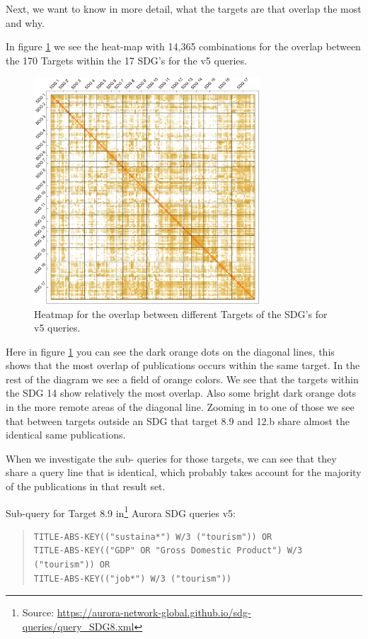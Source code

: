 \documentclass{article}
\begin{document}
Next, we want to know in more detail, what the targets are that overlap the most and why.

In  figure \ref{heatmapoverlapv5subqueries} we see the heat-map with 14,365 combinations for the overlap between the 170 Targets within the 17 SDG's for the v5 queries. 

\begin{figure}[H]
	\centering
  \includegraphics[width=0.75\textwidth]{figures/overlap_per_subquery.pdf}
	\caption{Heatmap for the overlap between different Targets of the SDG's for v5 queries.}
	\label{heatmapoverlapv5subqueries}
\end{figure}

Here in figure \ref{heatmapoverlapv5subqueries} you can see the dark orange dots on the diagonal lines, this shows that the most overlap of publications occurs within the same target. In the rest of the diagram we see a field of orange colors. We see that the targets within the SDG 14 show relatively the most overlap. Also some bright dark orange dots in the more remote areas of the diagonal line. Zooming in to one of those we see that between targets outside an SDG that target 8.9 and 12.b share almost the identical same publications.

When we investigate the sub- queries for those targets, we can see that they share a query line that is identical, which probably takes account for the majority of the publications in that result set.

Sub-query for Target 8.9 in\footnote{ Source: \url{https://aurora-network-global.github.io/sdg-queries/query_SDG8.xml}} Aurora SDG queries v5: 
\begin{quote}
\begin{verbatim}
TITLE-ABS-KEY(("sustaina*") W/3 ("tourism")) OR 
TITLE-ABS-KEY(("GDP" OR "Gross Domestic Product") W/3 ("tourism")) OR 
TITLE-ABS-KEY(("job*") W/3 ("tourism"))
\end{verbatim}
\end{quote}
\end{document}
